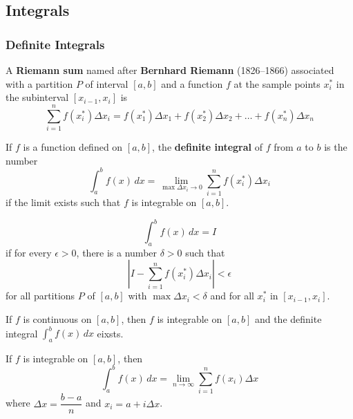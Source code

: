 \subsection{Integrals}
\subsubsection{Definite Integrals}
A \textbf{Riemann sum} named after \textbf{Bernhard Riemann} (1826--1866)
associated with a partition \(P\) of interval \([a,b]\) and a function \(f\)
at the sample points \(x_i^*\) in the subinterval \([x_{i-1},x_i]\) is
\[\sum_{i=1}^n f(x_i^*)\Delta x_i=f(x_1^*)\Delta x_1+f(x_2^*)\Delta x_2
+\dots+f(x_n^*)\Delta x_n\]
\begin{definition}
    If \(f\) is a function defined on \([a,b]\),
    the \textbf{definite integral} of \(f\) from \(a\) to \(b\) is the number
    \[\int_a^b f(x)\,dx=\lim_{\max\Delta x_i\to 0}
    \sum_{i=1}^n f(x_i^*)\Delta x_i\]
    if the limit exists such that \(f\) is integrable on \([a,b]\).
\end{definition}
\begin{definition}
    \[\int_a^b f(x)\,dx=I\]
    if for every \(\epsilon>0\), there is a number \(\delta>0\) such that
    \[\left\lvert I-\sum_{i=1}^n f(x_i^*)\Delta x_i\right\rvert<\epsilon\]
    for all partitions \(P\) of \([a,b]\) with \(\max\Delta x_i<\delta\) and
    for all \(x_i^*\) in \([x_{i-1},x_i]\).
\end{definition}
\begin{theorem}
    If \(f\) is continuous on \([a,b]\), then \(f\) is integrable on \([a,b]\)
    and the definite integral \(\displaystyle{\int_a^b f(x)\,dx}\) eixsts.
\end{theorem}
\begin{theorem}
    If \(f\) is integrable on \([a,b]\), then
    \[\int_a^b f(x)\,dx=\lim_{n\to\infty}\sum_{i=1}^nf(x_i)\Delta x\]
    where \(\Delta x=\dfrac{b-a}{n}\) and \(x_i=a+i\Delta x\).
\end{theorem}

